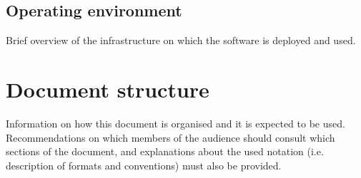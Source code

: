 \subsection{Operating environment}
Brief overview of the infrastructure on which the software is deployed and used.

\section{Document structure}  
Information on how this document is organised and it is expected to be
used. Recommendations on which members of the audience
should consult which sections of the document, and explanations about the used
notation (i.e. description of formats and conventions) must also be provided.





